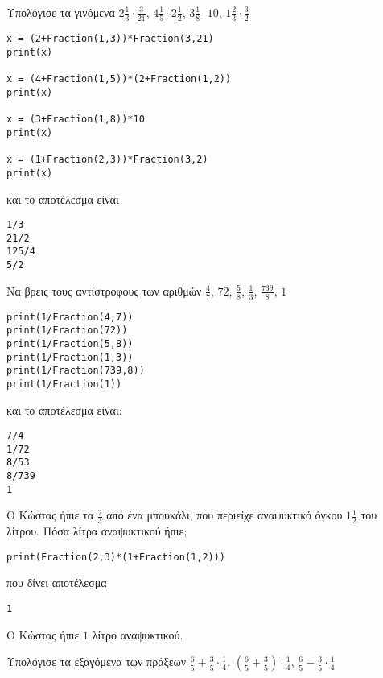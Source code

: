 \begin{exercise}
Υπολόγισε τα γινόμενα $2\frac{1}{3}\cdot\frac{3}{21}$, $4\frac{1}{5}\cdot 2\frac{1}{2}$, $3\frac{1}{8}\cdot 10$, $1\frac{2}{3}\cdot\frac{3}{2}$
\end{exercise}
\begin{lstlisting}
x = (2+Fraction(1,3))*Fraction(3,21)
print(x)

x = (4+Fraction(1,5))*(2+Fraction(1,2))
print(x)

x = (3+Fraction(1,8))*10
print(x)

x = (1+Fraction(2,3))*Fraction(3,2)
print(x)
\end{lstlisting}
και το αποτέλεσμα είναι
\begin{lstlisting}
1/3
21/2
125/4
5/2
\end{lstlisting}
\begin{exercise}
Να βρεις τους αντίστροφους των αριθμών $\frac{4}{7}$, $72$, $\frac{5}{8}$, $\frac{1}{3}$, $\frac{739}{8}$, $1$
\end{exercise}
\begin{lstlisting}
print(1/Fraction(4,7))
print(1/Fraction(72))
print(1/Fraction(5,8))
print(1/Fraction(1,3))
print(1/Fraction(739,8))
print(1/Fraction(1))
\end{lstlisting}
και το αποτέλεσμα είναι:
\begin{lstlisting}
7/4
1/72
8/53
8/739
1
\end{lstlisting}
\begin{exercise}
Ο Κώστας ήπιε τα $\frac{2}{3}$ από ένα μπουκάλι, που περιείχε αναψυκτικό όγκου $1\frac{1}{2}$ του λίτρου. Πόσα λίτρα αναψυκτικού ήπιε;
\end{exercise}
\begin{lstlisting}
print(Fraction(2,3)*(1+Fraction(1,2)))
\end{lstlisting}
που δίνει αποτέλεσμα
\begin{lstlisting}
1
\end{lstlisting}
Ο Κώστας ήπιε $1$ λίτρο αναψυκτικού.

\begin{exercise}
Υπολόγισε τα εξαγόμενα των πράξεων $\frac{6}{5} + \frac{3}{5}\cdot\frac{1}{4}$, $(\frac{6}{5} + \frac{3}{5})\cdot\frac{1}{4}$,
$\frac{6}{5} - \frac{3}{5}\cdot\frac{1}{4}$
\end{exercise}

